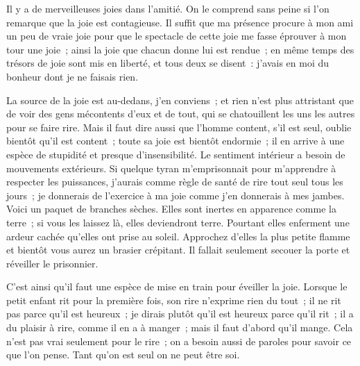 
{Il y a de merveilleuses joies dans l'amitié. On le comprend sans peine si l'on remarque que la joie est contagieuse. Il suffit que ma présence procure à mon ami un peu de vraie joie pour que le spectacle de cette joie me fasse éprouver à mon tour une joie~; ainsi la joie que chacun donne lui est rendue~; en même temps des trésors de joie sont mis en liberté, et tous deux se disent~: j'avais en moi du bonheur dont je ne faisais rien.

La source de la joie est au-dedans, j'en conviens~; et rien n'est plus attristant que de voir des gens mécontents d'eux et de tout, qui se chatouillent les uns les autres pour se faire rire. Mais il faut dire aussi que l'homme content, s'il est seul, oublie bientôt qu'il est content~; toute sa joie est bientôt endormie~; il en arrive à une espèce de stupidité et presque d'insensibilité. Le sentiment intérieur a besoin de mouvements extérieurs. Si quelque tyran m'emprisonnait pour m'apprendre à respecter les puissances, j'aurais comme règle de santé de rire tout seul tous les jours~; je donnerais de l'exercice à ma joie comme j'en donnerais à mes jambes.
Voici un paquet de branches sèches. Elles sont inertes en apparence comme la terre~; si vous les laissez là, elles deviendront terre. Pourtant elles enferment une ardeur cachée qu'elles ont prise au soleil. Approchez d'elles la plus petite flamme et bientôt vous aurez un brasier crépitant. Il fallait seulement secouer la porte et réveiller le prisonnier.

C'est ainsi qu'il faut une espèce de mise en train pour éveiller la joie. Lorsque le petit enfant rit pour la première fois, son rire n'exprime rien du tout~; il ne rit pas parce qu'il est heureux~; je dirais plutôt qu'il est heureux parce qu'il rit~; il a du plaisir à rire, comme il en a à manger~; mais il faut d'abord qu'il mange. Cela n'est pas vrai seulement pour le rire~; on a besoin aussi de paroles pour savoir ce que l'on pense. Tant qu'on est seul on ne peut être soi.
}

